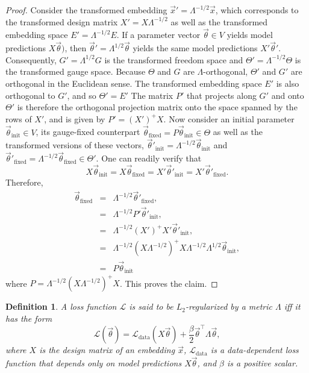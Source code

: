 \documentclass{article}
\numberwithin{myclaim}{section}
\newcommand{\myinit}{\mathrm{init}}
\newcommand{\myfixed}{\mathrm{fixed}}
\newtheorem{definition}{Definition}
\begin{document}
\begin{proof}
Consider the transformed embedding $\vec{x}' = \Lambda^{-1/2} \vec{x}$, which corresponds to the transformed design matrix $X' = X \Lambda^{-1/2}$ as well as the transformed embedding space $E' = \Lambda^{-1/2} E$. If a parameter vector $\vec{\theta} \in V$ yields model predictions $X \vec{\theta})$, then $\vec{\theta}' = \Lambda^{1/2} \vec{\theta}$ yields the same model predictions $X'\vec{\theta}'$. Consequently,  $G' = \Lambda^{1/2} G$ is the transformed freedom space and $\Theta' = \Lambda^{-1/2} \Theta$ is the transformed gauge space. Because $\Theta$ and $G$ are $\Lambda$-orthogonal, $\Theta'$ and $G'$ are orthogonal in the Euclidean sense. The transformed embedding space $E'$ is also orthogonal to $G'$, and so $\Theta' = E'$ The matrix $P'$ that projects along $G'$ and onto $\Theta'$ is therefore the orthogonal projection matrix onto the space spanned by the rows of $X'$, and is given by $P' = (X')^+ X$. Now consider an initial parameter $\vec{\theta}_\myinit \in V$, its gauge-fixed counterpart $\vec{\theta}_\myfixed = P \vec{\theta}_\myinit \in \Theta$ as well as the transformed versions of these vectors, $\vec{\theta}'_\myinit = \Lambda^{-1/2} \vec{\theta}_\myinit$ and $\vec{\theta}'_\myfixed = \Lambda^{-1/2} \vec{\theta}_\myfixed \in \Theta'$. One can readily verify that
\begin{equation}
    X \vec{\theta}_\myinit = X \vec{\theta}_\myfixed =  X' \vec{\theta}'_\myinit = X' \vec{\theta}'_\myfixed.
\end{equation}
Therefore,
\begin{eqnarray}
    \vec{\theta}_\myfixed &=& \Lambda^{-1/2} \vec{\theta}'_\myfixed, \\
    &=& \Lambda^{-1/2} P' \vec{\theta}'_\myinit, \\
    &=& \Lambda^{-1/2} (X')^+ X' \vec{\theta}'_\myinit, \\
    &=& \Lambda^{-1/2} (X \Lambda^{-1/2})^+ X \Lambda^{-1/2} \Lambda^{1/2} \vec{\theta}_\myinit, \\
    &=& P \vec{\theta}_\myinit
\end{eqnarray}
where $P = \Lambda^{-1/2} (X \Lambda^{-1/2})^+ X$. This proves the claim. 
\end{proof}

\begin{definition}
A loss function $\mathcal{L}$ is said to be $L_2$-regularized by a metric $\Lambda$ iff it has the form 
\begin{equation}
    \mathcal{L}(\vec{\theta}) = \mathcal{L}_\mathrm{data}(X\vec{\theta}) + \frac{\beta}{2} \vec{\theta}^\top \Lambda \vec{\theta},
\end{equation}
where $X$ is the design matrix of an embedding $\vec{x}$, $\mathcal{L}_\mathrm{data}$ is a data-dependent loss function that depends only on model predictions $X \vec{\theta}$, and $\beta$ is a positive scalar.
\end{definition}
\end{document}
